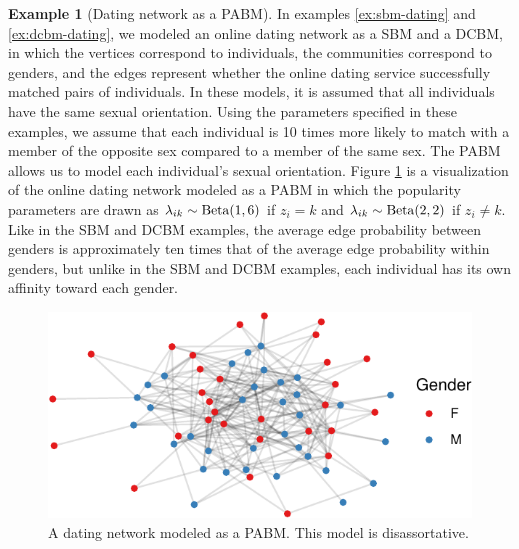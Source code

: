 \documentclass[
  11pt,
]{article}
\theoremstyle{definition}
\theoremstyle{definition}
\newtheorem{example}{Example}[section]
\theoremstyle{definition}
\theoremstyle{definition}
\theoremstyle{remark}
\begin{document}
\begin{example}[Dating network as a PABM]
\label{ex:pabm-dating}
In examples \ref{ex:sbm-dating} and \ref{ex:dcbm-dating}, we modeled an online dating network as a SBM and a DCBM, in which the vertices correspond to individuals, the communities correspond to genders, and the edges represent whether the online dating service successfully matched pairs of individuals. 
In these models, it is assumed that all individuals have the same sexual orientation. 
Using the parameters specified in these examples, we assume that each individual is 10 times more likely to match with a member of the opposite sex compared to a member of the same sex. 
The PABM allows us to model each individual's sexual orientation. 
Figure \ref{fig:dating-pabm} is a visualization of the online dating network modeled as a PABM in which the popularity parameters are drawn as $\lambda_{ik} \sim \mathrm{Beta}(1, 6)$ if $z_i = k$ and $\lambda_{ik} \sim \mathrm{Beta}(2, 2)$ if $z_i \neq k$. 
Like in the SBM and DCBM examples, the average edge probability between genders is approximately ten times that of the average edge probability within genders, but unlike in the SBM and DCBM examples, each individual has its own affinity toward each gender. 

\begin{figure}[H]

{\centering \includegraphics{draft_files/figure-latex/dating-pabm-1} 

}

\caption{A dating network modeled as a PABM. This model is disassortative.}\label{fig:dating-pabm}
\end{figure}
\end{example}
\end{document}
